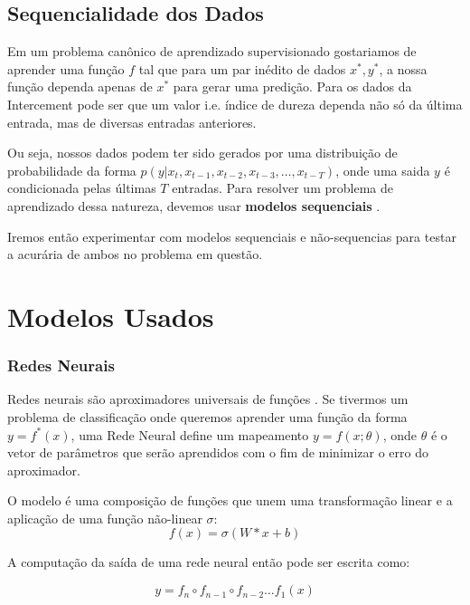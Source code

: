 
\subsection{Sequencialidade dos Dados}

Em um problema canônico de aprendizado supervisionado gostariamos de aprender
uma função $f$ tal que para um par inédito de dados $x^*,y^*$, a nossa função
dependa apenas de $x^*$ para gerar uma predição. Para os dados da Intercement pode ser que um valor i.e. índice de dureza dependa não só da última entrada, mas de diversas entradas anteriores. 

Ou seja, nossos dados podem ter sido gerados por uma distribuição de
probabilidade da forma $p(y | x_{t} ,x_{t -1},x_{t -2},x_{t-3} , \dots,
x_{t-T})$, onde uma saida $y$ é condicionada pelas últimas $T$ entradas. Para
resolver um problema de aprendizado dessa natureza, devemos usar \textbf{modelos
  sequenciais} \citep{dlbook}. 

Iremos então experimentar com modelos sequenciais e não-sequencias para testar a acurária de ambos no problema em questão.


\section{Modelos Usados} 

\subsubsection{Redes Neurais}


Redes neurais são aproximadores universais de funções \citep{nnuni}. Se tivermos um problema
de classificação onde queremos aprender uma função da forma $y = f^*(x)$, uma
Rede Neural define um mapeamento $y = f(x ; \theta)$, onde $\theta$ é o vetor de
parâmetros que serão aprendidos com o fim de minimizar o erro do aproximador.

O modelo é uma composição de funções que unem uma transformação linear e
a aplicação de uma função não-linear $\sigma$: \\

\[ f(x)=  \sigma(W*x + b) \]

A computação da saída de uma rede neural então pode ser escrita como:

\[   y = f_n \circ f_{n-1} \circ f_{n-2} \dots f_1(x)  \]

